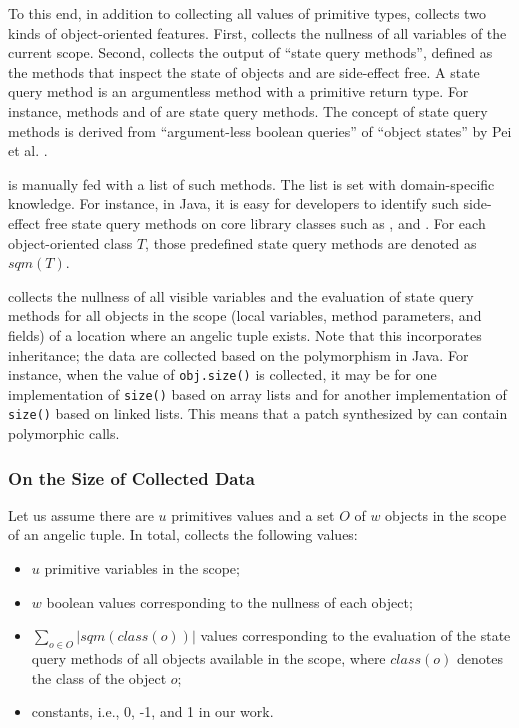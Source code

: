 To this end, in addition to collecting all values of primitive types, \nopol collects two kinds of object-oriented features.
First, \nopol collects the nullness of all variables of the current scope.
Second, \nopol collects the output of ``state query methods'', defined as the methods that inspect the state of objects and are side-effect free. A state query method is an argumentless method with a primitive return type. 
For instance, methods  and  of  are state query methods.
The concept of state query methods is derived from ``argument-less boolean queries'' of  ``object states'' by Pei et al. \cite{pei2014automated}.  

\nopol is manually fed with a list of such methods. The list is set with domain-specific knowledge. For instance, in Java, it is easy for developers to identify such side-effect free state query methods on core library classes such as ,  and . For each object-oriented class $T$, those predefined state query methods are denoted as $sqm(T)$.

\nopol collects the nullness of all visible variables and the evaluation of state query methods for all objects in the scope (local variables, method parameters, and fields) of a location where an angelic tuple exists. Note that this incorporates inheritance; the data are collected based on the polymorphism in Java.
For instance, when the value of \texttt{obj.size()} is collected, it may be for one implementation of \texttt{size()} based on array lists and for another implementation of \texttt{size()} based on linked lists. This means that a patch synthesized by \nopol can contain polymorphic calls. 

\subsubsection{On the Size of Collected Data}

Let us assume there are $u$ primitives values and a set $O$ of $w$ objects in the scope of an angelic tuple. 
In total, \nopol collects the following values:

\begin{itemize}
\item $u$ primitive variables in the scope;
\item $w$ boolean values corresponding to the nullness of each object;
\item $\sum_{o \in O}|sqm(class(o))|$ values corresponding to the evaluation of the state query methods of all objects available in the scope, where $class(o)$ denotes the class of the object $o$;
\item constants, i.e., 0, -1, and 1 in our work.
\end{itemize}

